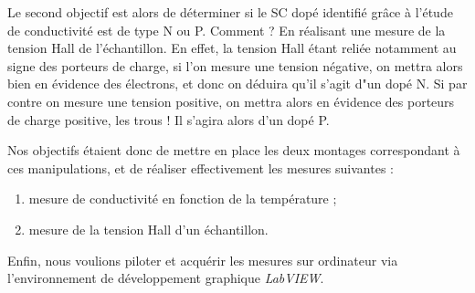 Le second objectif est alors de déterminer si le SC dopé identifié grâce à l'étude de 
conductivité est de type N ou P.
Comment ? En réalisant une mesure de la tension Hall de l'échantillon.
En effet, la tension Hall étant reliée notamment au signe des porteurs de charge, si l'on mesure une tension négative, 
on mettra alors bien en évidence des électrons, et donc on déduira qu'il s'agit d"un dopé N.
Si par contre on mesure une tension positive, on mettra alors en évidence des porteurs de charge positive, les trous !
Il s'agira alors d'un dopé P.

\bigskip
Nos objectifs étaient donc de mettre en place les deux montages correspondant à ces manipulations, 
et de réaliser effectivement les mesures suivantes :
\begin{enumerate}
\item mesure de conductivité en fonction de la température ;
\item mesure de la tension Hall d'un échantillon.
\end{enumerate}
Enfin, nous voulions piloter et acquérir les mesures sur ordinateur via l'environnement 
de développement graphique \textit{LabVIEW}.

